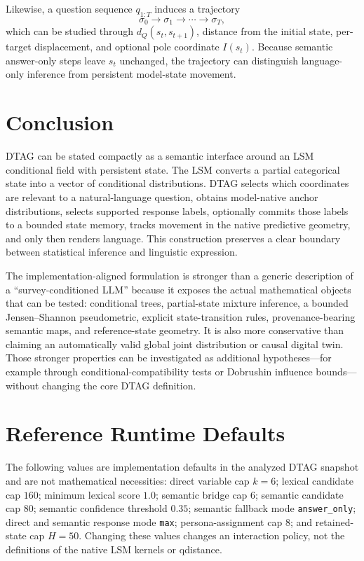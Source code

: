 \documentclass[journal]{IEEEtran}
\newcommand{\1}{\mathbf{1}}
\begin{document}
Likewise, a question sequence $q_{1:T}$ induces a trajectory
\begin{equation}
  \sigma_0\to\sigma_1\to\cdots\to\sigma_T,
\end{equation}
which can be studied through $d_Q(s_t,s_{t+1})$, distance from the initial state, per-target displacement, and optional pole coordinate $I(s_t)$. Because semantic answer-only steps leave $s_t$ unchanged, the trajectory can distinguish language-only inference from persistent model-state movement.

\section{Conclusion}

DTAG can be stated compactly as a semantic interface around an LSM conditional field with persistent state. The LSM converts a partial categorical state into a vector of conditional distributions. DTAG selects which coordinates are relevant to a natural-language question, obtains model-native anchor distributions, selects supported response labels, optionally commits those labels to a bounded state memory, tracks movement in the native predictive geometry, and only then renders language. This construction preserves a clear boundary between statistical inference and linguistic expression.

The implementation-aligned formulation is stronger than a generic description of a ``survey-conditioned LLM'' because it exposes the actual mathematical objects that can be tested: conditional trees, partial-state mixture inference, a bounded Jensen--Shannon pseudometric, explicit state-transition rules, provenance-bearing semantic maps, and reference-state geometry. It is also more conservative than claiming an automatically valid global joint distribution or causal digital twin. Those stronger properties can be investigated as additional hypotheses---for example through conditional-compatibility tests or Dobrushin influence bounds---without changing the core DTAG definition.

\appendices

\section{Reference Runtime Defaults}
\label{app:defaults}

The following values are implementation defaults in the analyzed DTAG snapshot and are not mathematical necessities: direct variable cap $k=6$; lexical candidate cap $160$; minimum lexical score $1.0$; semantic bridge cap $6$; semantic candidate cap $80$; semantic confidence threshold $0.35$; semantic fallback mode \texttt{answer\_only}; direct and semantic response mode \texttt{max}; persona-assignment cap $8$; and retained-state cap $H=50$. Changing these values changes an interaction policy, not the definitions of the native LSM kernels or qdistance.
\end{document}
